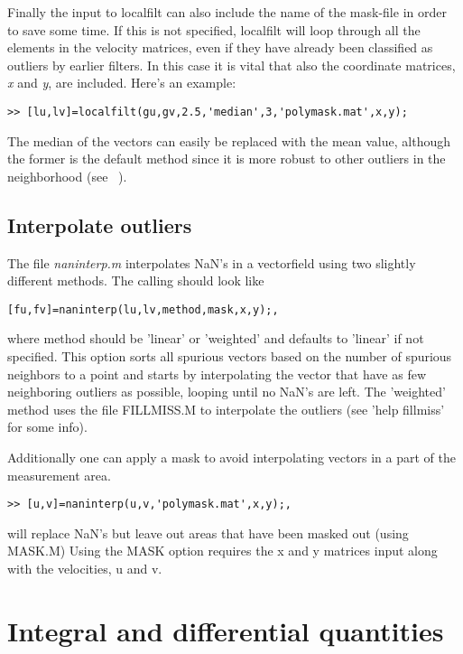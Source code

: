 \documentclass{book}
\begin{document}
Finally the input to localfilt can also include the name of the
mask-file in order to save some time. If this is not specified,
localfilt will loop through all the elements in the velocity matrices,
even if they have already been classified as outliers by earlier
filters. In this case it is vital that also the coordinate matrices,
{\em x} and {\em y}, are included. Here's an example:
\begin{verbatim}
>> [lu,lv]=localfilt(gu,gv,2.5,'median',3,'polymask.mat',x,y);
\end{verbatim}

The median of the vectors can easily be replaced with the mean value,
although the former is the default method since it is more robust to
other outliers in the neighborhood (see ~\cite{Westerweel:1997}).


\subsection{Interpolate outliers}

The file {\em naninterp.m} interpolates NaN's in a vectorfield using two
slightly different methods. The calling should look like

\begin{verbatim}
[fu,fv]=naninterp(lu,lv,method,mask,x,y);,
\end{verbatim}
where method should be 'linear' or 'weighted' and defaults to 'linear'
if not specified. This option sorts all spurious vectors based on the
number of spurious neighbors to a point and starts by interpolating
the vector that have as few neighboring outliers as possible, looping
until no NaN's are left. The 'weighted' method uses the file FILLMISS.M
to interpolate the outliers (see 'help fillmiss' for some info).

Additionally one can apply a mask to avoid interpolating vectors in
a part of the measurement area.
\begin{verbatim}
>> [u,v]=naninterp(u,v,'polymask.mat',x,y);,
\end{verbatim}
will replace NaN's but leave out areas that have been masked out
(using MASK.M) Using the MASK option requires the x and y matrices
input along with the velocities, u and v. 


\section{Integral and differential quantities}
\end{document}
